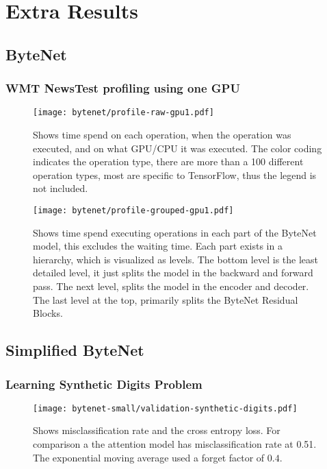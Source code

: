 \chapter{Extra Results}

\section{ByteNet}
\label{appendix:result:bytenet-profile}

\subsection{WMT NewsTest profiling using one GPU}
\begin{figure}[h]
    \centering
    \texttt{[image: bytenet/profile-raw-gpu1.pdf]}
    \caption{Shows time spend on each operation, when the operation was executed, and on what GPU/CPU it was executed. The color coding indicates the operation type, there are more than a 100 different operation types, most are specific to TensorFlow, thus the legend is not included.}
\end{figure}


\begin{figure}[h]
    \centering
    \texttt{[image: bytenet/profile-grouped-gpu1.pdf]}
    \caption{Shows time spend executing operations in each part of the ByteNet model, this excludes the waiting time. Each part exists in a hierarchy, which is visualized as levels. The bottom level is the least detailed level, it just splits the model in the backward and forward pass. The next level, splits the model in the encoder and decoder. The last level at the top, primarily splits the ByteNet Residual Blocks.}
\end{figure}

\clearpage

\section{Simplified ByteNet}
\label{appendix:result:bytenet-small}
\subsection{Learning Synthetic Digits Problem}
\begin{figure}[h]
    \centering
    \texttt{[image: bytenet-small/validation-synthetic-digits.pdf]}
    \caption{Shows misclassification rate and the cross entropy loss. For comparison a the attention model has misclassification rate at 0.51. The exponential moving average used a forget factor of $0.4$.}
\end{figure}
\clearpage

